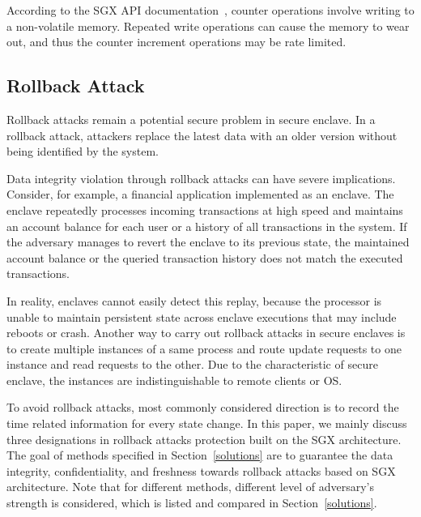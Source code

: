 According to the SGX API documentation~\cite{}, counter operations involve writing to a non-volatile memory. Repeated write operations can cause the memory to wear out, and thus the counter increment operations may be rate limited. 


\subsection{Rollback Attack}

Rollback attacks remain a potential secure problem in secure enclave. In a rollback attack, attackers replace the latest data with an older version without being identified by the system. 

Data integrity violation through rollback attacks can have severe implications. Consider, for example, a financial application implemented as an enclave. The enclave repeatedly processes incoming transactions at high speed and maintains an account balance for each user or a history of all transactions in the system. If the adversary manages to revert the enclave to its previous state, the maintained account balance or the queried transaction history does not match the executed transactions.

In reality, enclaves cannot easily detect this replay, because the processor is unable to maintain persistent state across enclave executions that may include reboots or crash. Another way to carry out rollback attacks in secure enclaves is to create multiple instances of a same process and route update requests to one instance and read requests to the other. Due to the characteristic of secure enclave, the instances are indistinguishable to remote clients or OS.

To avoid rollback attacks, most commonly considered direction is to record the time related information for every state change. In this paper, we mainly discuss three designations in rollback attacks protection built on the SGX architecture. The goal of methods specified in Section~\ref{solutions} are to guarantee the data integrity, confidentiality, and freshness towards rollback attacks based on SGX architecture. Note that for different methods, different level of adversary's strength is considered, which is listed and compared in Section~\ref{solutions}.

